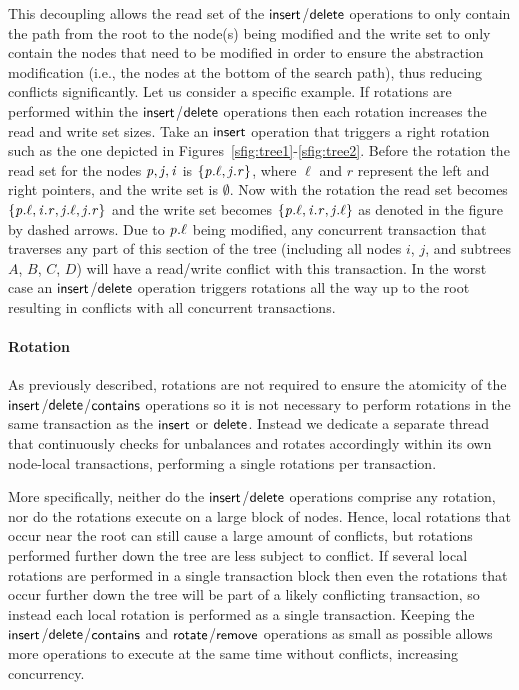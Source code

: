 This decoupling allows the read set of the $\act{insert}$/$\lit{delete}$ operations to only contain the path from the root to the node(s) being modified and the write set to only contain
the nodes that need to be modified in order to ensure the abstraction modification (i.e., the nodes at the bottom of the search path), thus reducing conflicts significantly.
Let us consider a specific example.
If rotations are performed within the $\act{insert}$/$\act{delete}$ operations then each rotation increases the read and write set sizes.
Take an $\act{insert}$ operation that triggers a right rotation such as the one depicted in Figures~\ref{sfig:tree1}-\ref{sfig:tree2}.
Before the rotation the read set for the nodes $\ms{p},\ms{j},\ms{i}$ is $\{\ms{p.\ell}, \ms{j.r}\}$, where $\ell$ and $r$ represent the left and right pointers, and the write set is $\emptyset$.
Now with the rotation the read set becomes $\{\ms{p.\ell}, \ms{i.r}, \ms{j.\ell}, \ms{j.r}\}$ and the write set becomes $\{\ms{p.\ell}, \ms{i.r}, \ms{j.\ell}\}$
as denoted in the figure by dashed arrows.
Due to $\ms{p.\ell}$ being modified, any concurrent transaction that traverses any part of this section of the tree (including all nodes $i$, $j$, and subtrees $A$, $B$, $C$, $D$)
will have a read/write conflict with this transaction.
In the worst case an $\act{insert}$/$\act{delete}$ operation triggers rotations all the way up to the root resulting in conflicts with all concurrent transactions.

\paragraph{Rotation}



As previously described, rotations are not required to ensure the atomicity of the $\act{insert}$/$\act{delete}$/$\act{contains}$ operations
so it is not necessary to perform rotations in the same transaction as the $\act{insert}$ or $\act{delete}$.
Instead we dedicate a separate thread that continuously checks for unbalances and rotates accordingly within its own node-local transactions,
performing a single rotations per transaction.

More specifically, neither do the $\act{insert}$/$\act{delete}$ operations comprise any rotation, nor do the rotations execute
on a large block of nodes. Hence, local
rotations that occur near the root can still cause a large amount of conflicts, but rotations performed further down the tree are less subject to conflict.
If several local rotations are performed in a single transaction block then even the rotations that occur further down the tree will be part of a likely conflicting transaction, 
so instead each local rotation is performed as a single transaction.
Keeping the $\act{insert}$/$\act{delete}$/$\act{contains}$ and $\act{rotate}$/$\act{remove}$ operations as small as possible allows more operations to execute at the same time without conflicts, increasing concurrency.

